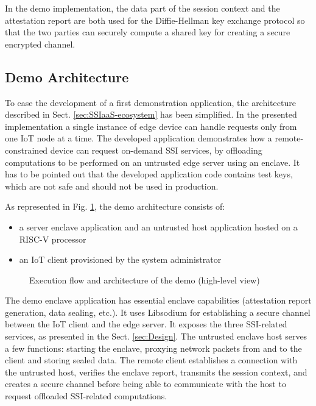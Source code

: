 In the demo implementation, the data part of the session context and the attestation report are both used for the Diffie-Hellman key exchange protocol so that the two parties can securely compute a shared key for creating a secure encrypted channel. 

\subsection{Demo Architecture}
\label{sect:demo-architecture}
To ease the development of a first demonstration application, the architecture described in Sect. \ref{sec:SSIaaS-ecosystem} has been simplified. In the presented implementation a single instance of edge device can handle requests only from one IoT node at a time. The developed application demonstrates how a remote-constrained device can request on-demand SSI services, by offloading computations to be performed on an untrusted edge server using an enclave. It has to be pointed out that the developed application code contains test keys, which are not safe and should not be used in production. 

As represented in Fig. \ref{poc-architecture-s}, the demo architecture consists of:
\begin{itemize}
    \item a server enclave application and an untrusted host application hosted on a RISC-V processor
    \item an IoT client provisioned by the system administrator  
\end{itemize} 

\begin{figure}[!h]
    \centering
    
    \caption{Execution flow and architecture of the demo (high-level view) }
    \label{poc-architecture-s}
\end{figure}

The demo enclave application has essential enclave capabilities (attestation report generation, data sealing, etc.). It uses Libsodium \cite{libsodium} for establishing a secure channel between the IoT client and the edge server. It exposes the three SSI-related services, as presented in the Sect. \ref{sec:Design}. The untrusted enclave host serves a few functions: starting the enclave, proxying network packets from and to the client and storing sealed data. The remote client establishes a connection with the untrusted host, verifies the enclave report, transmits the session context, and creates a secure channel before being able to communicate with the host to request offloaded SSI-related computations. 

